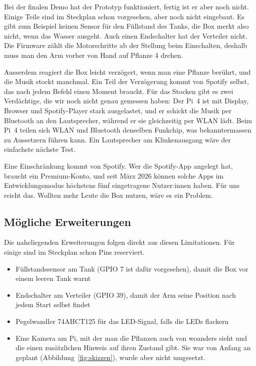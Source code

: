 \documentclass[11pt,a4paper]{article}
\begin{document}
Bei der finalen Demo hat der Prototyp funktioniert, fertig ist er aber noch nicht. Einige Teile sind im Steckplan schon vorgesehen, aber noch nicht eingebaut. Es gibt zum Beispiel keinen Sensor für den Füllstand des Tanks, die Box merkt also nicht, wenn das Wasser ausgeht. Auch einen Endschalter hat der Verteiler nicht. Die Firmware zählt die Motorschritte ab der Stellung beim Einschalten, deshalb muss man den Arm vorher von Hand auf Pflanze 4 drehen.

Ausserdem reagiert die Box leicht verzögert, wenn man eine Pflanze berührt, und die Musik stockt manchmal. Ein Teil der Verzögerung kommt von Spotify selbst, das nach jedem Befehl einen Moment braucht. Für das Stocken gibt es zwei Verdächtige, die wir noch nicht genau gemessen haben: Der Pi~4 ist mit Display, Browser und Spotify-Player stark ausgelastet, und er schickt die Musik per Bluetooth an den Lautsprecher, während er sie gleichzeitig per WLAN lädt. Beim Pi~4 teilen sich WLAN und Bluetooth denselben Funkchip, was bekanntermassen zu Aussetzern führen kann. Ein Lautsprecher am Klinkenausgang wäre der einfachste nächste Test.

Eine Einschränkung kommt von Spotify. Wer die Spotify-App angelegt hat, braucht ein Premium-Konto, und seit März 2026 können solche Apps im Entwicklungsmodus höchstens fünf eingetragene Nutzer:innen haben. Für uns reicht das. Wollten mehr Leute die Box nutzen, wäre es ein Problem.

\subsection{Mögliche Erweiterungen}

Die naheliegenden Erweiterungen folgen direkt aus diesen Limitationen. Für einige sind im Steckplan schon Pins reserviert.

\begin{itemize}[itemsep=2pt]
  \item Füllstandssensor am Tank (GPIO 7 ist dafür vorgesehen), damit die Box vor einem leeren Tank warnt
  \item Endschalter am Verteiler (GPIO 39), damit der Arm seine Position nach jedem Start selbst findet
  \item Pegelwandler 74AHCT125 für das LED-Signal, falls die LEDs flackern
  \item Eine Kamera am Pi, mit der man die Pflanzen auch von woanders sieht und die einen zusätzlichen Hinweis auf ihren Zustand gibt. Sie war von Anfang an geplant (Abbildung~\ref{fig:skizzen}), wurde aber nicht umgesetzt.
\end{itemize}
\end{document}
